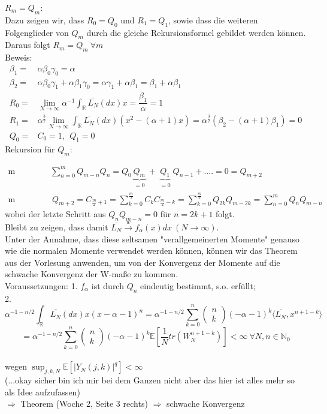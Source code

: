 \documentclass[a4paper, 11pt]{scrreprt}
\newcommand{\RR}{\mathbb{R}}
\newcommand{\EE}{\mathbb{E}}
\newcommand{\NN}{\mathbb{N}}
\begin{document}
{$ R_m=Q_m $:}\\
Dazu zeigen wir, dass $ R_0=Q_0 $ und $ R_1=Q_1 $, sowie dass die weiteren Folgenglieder von $ Q_m $ durch die gleiche Rekursionsformel gebildet werden können. Daraus folgt $ R_m=Q_m ~ \forall m$ \\

Beweis: \begin{align*}
\beta_1=& \alpha \beta_0 \gamma_0 = \alpha \\
\beta_2=& \alpha \beta_0 \gamma_1 + \alpha \beta_1 \gamma_0 = \alpha \gamma_1 + \alpha \beta_1 = \beta_1 + \alpha \beta_1  \\
R_0 =& \lim_{N \to \infty} \alpha^{-1} \int_{\RR}\overline{L_{N}}(dx)x = \dfrac{\beta_1}{\alpha}=1 \\
R_1 =& \alpha^{\frac{3}{2}} \lim_{N \to \infty}\int_{\RR}\overline{L_{N}}(dx)(x^2 - (\alpha +1)x)= \alpha^{\frac{3}{2}} (\beta_2 - (\alpha+1)\beta_1)=0 \\
Q_0=& C_0 =1, ~~Q_1=0
\end{align*}
Rekursion für $ Q_m: $

\begin{align*}
\text{m ungerade:}& \sum_{n=0}^m Q_{m-n}Q_n= Q_0 \underbrace{Q_m}_{\substack{=0}} + \underbrace{Q_1}_{\substack{=0}}Q_{n-1}+....= 0=Q_{m+2}\\
\text {m gerade:}&~ Q_{m+2}= C_{\frac{m}{2}+1}= \sum_{k=0}^{\frac{m}{2}} C_k C_{\frac{m}{2}-k}=\sum_{k=0}^{\frac{m}{2}} Q_{2k}Q_{m-2k}=\sum_{n=0}^{m}Q_n Q_{m-n}
\end{align*}
wobei der letzte Schritt aus $ Q_n Q_{m-n}=0 $ für $ n=2k+1 $ folgt.\\

Bleibt zu zeigen, dass damit $ \overline{L_N} \overset{w}{\rightarrow} f_\alpha (x)dx~(N \rightarrow \infty) $. \\
Unter der Annahme, dass diese seltsamen "verallgemeinerten Momente" genauso wie die normalen Momente verwendet werden können, können wir das Theorem aus der Vorlesung anwenden, um von der Konvergenz der Momente auf die schwache Konvergenz der W-maße zu kommen. \\
Voraussetzungen: 1. $ f_\alpha $ ist durch $ Q_n $ eindeutig bestimmt, s.o. erfüllt;\\
2. \[ \alpha^{-1-n/2} \int_{\RR}\overline{L_{N}}(dx)x(x-\alpha-1)^{n} = \alpha^{-1-n/2}\sum_{k=0}^n \begin{pmatrix} n\\k\end{pmatrix} (-\alpha -1)^k \langle \overline{L_N}, x^{n+1-k} \rangle \] 
\[= \alpha^{-1-n/2}\sum_{k=0}^n \begin{pmatrix} n\\k\end{pmatrix} (-\alpha -1)^k \EE [\dfrac{1}{N} tr(W_N^{n+1-k})]
< \infty ~\forall N,n \in \NN_0 \]\\
wegen $ \sup_{j,k,N} \EE[\vert Y_N(j,k)\vert ^{q}]< \infty$ \\
(...okay sicher bin ich mir bei dem Ganzen nicht aber das hier ist alles mehr so als Idee aufzufassen)\\
$ \Rightarrow $ Theorem (Woche 2, Seite 3 rechts) $ \Rightarrow $ schwache Konvergenz
\end{document}
